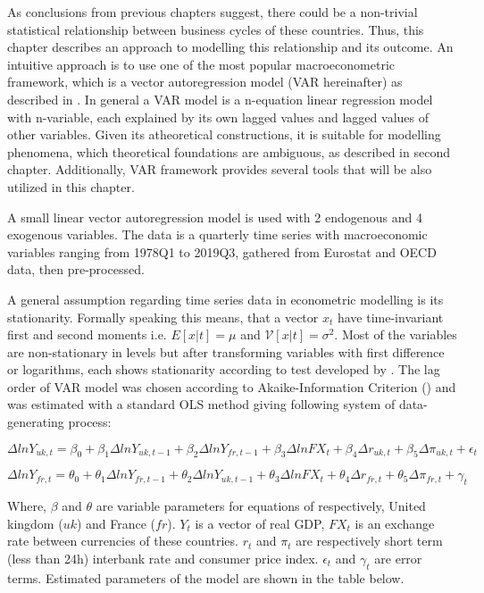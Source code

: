\documentclass{article}
\begin{document}
As conclusions from previous chapters suggest, there could be a non-trivial statistical relationship between business cycles of these countries. Thus, this chapter describes an approach to modelling this relationship and its outcome. An intuitive approach is to use one of the most popular macroeconometric framework, which is a vector autoregression model (VAR hereinafter) as described in \cite{sims}. In general a VAR model is a n-equation linear regression model with n-variable, each explained by its own lagged values and lagged values of other variables. Given its atheoretical constructions, it is suitable for modelling phenomena, which theoretical foundations are ambiguous, as described in second chapter. Additionally, VAR framework provides several tools that will be also utilized in this chapter.

A small linear vector autoregression model is used with 2 endogenous and 4 exogenous variables. The data is a quarterly time series with macroeconomic variables ranging from 1978Q1 to 2019Q3, gathered from Eurostat and OECD data, then pre-processed. 

A general assumption regarding time series data in econometric modelling is its stationarity. Formally speaking this means, that a vector $x_t$ have time-invariant first and second moments i.e. $E[x | t] = \mu$ and $\mathcal{V}[x | t] = \sigma^2$. Most of the variables are non-stationary in levels but after transforming variables with first difference  or logarithms, each shows stationarity according to test developed by \cite{perron}. The lag order of VAR model was chosen according to Akaike-Information Criterion (\cite{Akaike1998}) and was estimated with a standard OLS method giving following system of data-generating process:


$$\Delta ln Y_{uk, t} = \beta_0 + \beta_1 \Delta ln Y_{uk, t-1} + \beta_2 \Delta ln Y_{fr, t-1} + \beta_3 \Delta ln FX_t + \beta_4 \Delta r_{uk, t} + \beta_5 \Delta \pi_{uk, t} + \epsilon_t$$

$$\Delta ln Y_{fr, t} = \theta_0 + \theta_1 \Delta ln Y_{fr, t-1} + \theta_2 \Delta ln Y_{uk, t-1} + \theta_3 \Delta ln FX_t + \theta_4 \Delta r_{fr, t} + \theta_5 \Delta \pi_{fr, t} + \gamma_t$$

Where, $\beta$ and $\theta$ are variable parameters for equations of respectively, United kingdom ($uk$) and France ($fr$). $Y_{t}$ is a vector of  real GDP, $FX_t$ is an exchange rate between currencies of these countries. $r_t$ and $\pi_t$ are respectively short term (less than 24h) interbank rate and consumer price index. $\epsilon_t$ and $\gamma_t$ are error terms. Estimated parameters of the model are shown in the table below.
\end{document}
